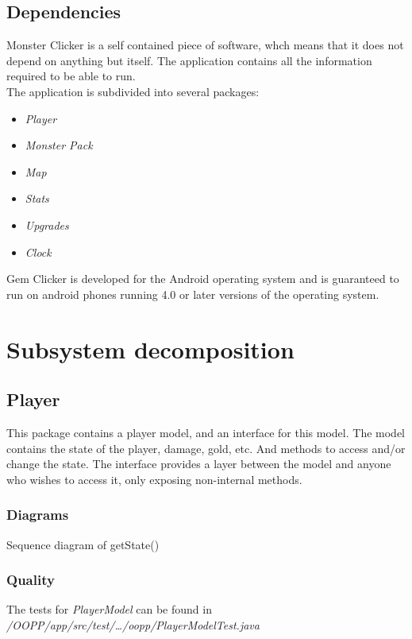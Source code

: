 \documentclass{article}
\begin{document}
\subsection{Dependencies}
Monster Clicker is a self contained piece of software, whch means that it does not
depend on anything but itself. The application contains all the information 
required to be able to run. \\

\noindent
The application is subdivided into several packages:
\begin{itemize}
    \item \emph{Player} 
    \item \emph{Monster Pack}
    \item \emph{Map}
    \item \emph{Stats}
    \item \emph{Upgrades}
    \item \emph{Clock}
\end{itemize}

\noindent
Gem Clicker is developed for the Android operating system and is guaranteed to
run on android phones running 4.0 or later versions of the operating system.  

\section{Subsystem decomposition}

\subsection{Player}
This package contains a player model, and an interface for this model. The model contains the state of the player, damage, gold, etc. And methods to access and/or change the state. The interface provides a layer between the model and anyone who wishes to access it, only exposing non-internal methods.
\newpage
\subsubsection{Diagrams}
\begin{center}
    Sequence diagram of getState()\\
\end{center}

\subsubsection{Quality}
The tests for \emph{PlayerModel} can be found in \emph{/OOPP/app/src/test/\ldots/oopp/PlayerModelTest.java}
\end{document}
